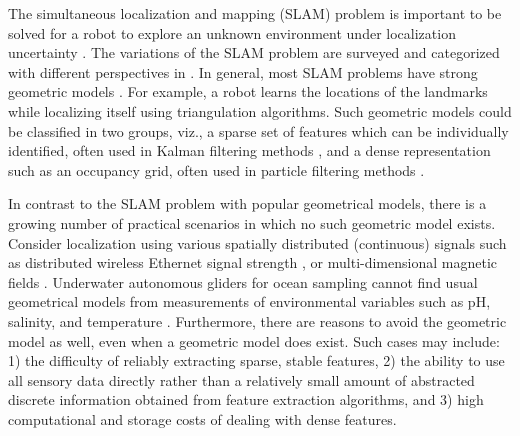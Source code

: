 \documentclass[letterpaper, 10 pt, conference]{ieeeconf}
\begin{document}
 The simultaneous  localization and mapping (SLAM) problem  is important to be solved    for  a robot  to explore  an unknown environment under localization uncertainty \cite{dissanayake2001solution}. 
%
%
The variations of the SLAM problem are surveyed and categorized with different perspectives in \cite{thrun2008simultaneous}.
In general, most SLAM problems have strong geometric models \cite{leonard1991simultaneous,dissanayake2001solution, guivant2001optimization,montemerlo2003fastslam,murphy1999bayesian,thrun2008simultaneous}. For example, a robot learns the locations of the landmarks while localizing itself using triangulation algorithms. Such geometric models could be classified in two groups, viz., 
	a sparse set of features which can be individually identified, often used in Kalman filtering methods \cite{dissanayake2001solution}, and 
	a dense representation such as an occupancy grid, often used in particle filtering methods \cite{grisettiyz2005improving}.

In contrast to the SLAM problem with popular geometrical models, there is a growing number of practical scenarios in which no such geometric model exists. Consider localization using various spatially distributed (continuous) signals such as distributed wireless Ethernet signal strength \cite{ferris2007wifi}, or multi-dimensional magnetic fields \cite{vallivaara2010simultaneous}. Underwater autonomous gliders for ocean sampling cannot find usual geometrical models from measurements of environmental variables such as pH, salinity, and temperature \cite{leonard:2007}. Furthermore, there are reasons to avoid the geometric model as well, even when a geometric model does exist.
 {Such cases may include:
 1)  the difficulty of reliably extracting sparse, stable features,
 2)  the ability to use all  sensory data directly  rather than a relatively small amount of abstracted discrete information obtained from feature extraction algorithms, and 
 3)  high computational and storage costs of dealing with dense features.}
 
\end{document}
